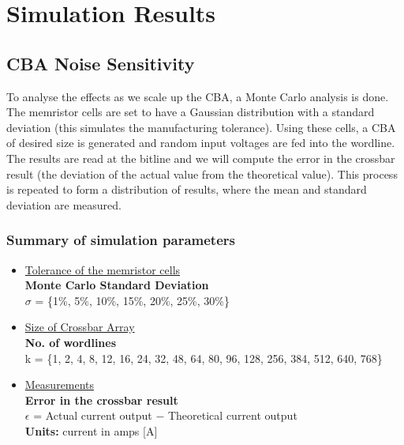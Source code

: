 
\chapter{Simulation Results}
\label{appendix:simulation_results}

\vspace{2em}

\section{\ac{CBA} Noise Sensitivity}
\label{appendix:simulation_results:cba_ns}

\noindent
To analyse the effects as we scale up the \ac{CBA}, a Monte Carlo analysis is done.
The memristor cells are set to have a Gaussian distribution with a standard deviation (this simulates the manufacturing tolerance).
Using these cells, a \ac{CBA} of desired size is generated and random input voltages are fed into the wordline.
The results are read at the bitline and we will compute the error in the crossbar result (the deviation of the actual value from the theoretical value). This process is repeated to form a distribution of results, where the mean and standard deviation are measured.

\subsection{Summary of simulation parameters}

\begin{itemize}
    \item \underline{Tolerance of the memristor cells}\\
        \textbf{Monte Carlo Standard Deviation} \\
            $\sigma$ = \{1\%,  5\%, 10\%, 15\%, 20\%, 25\%, 30\%\}
    \item \underline{Size of Crossbar Array} \\
        \textbf{No. of wordlines} \\
        k = \{1, 2, 4, 8, 12, 16, 24, 32, 48, 64, 80, 96, 128, 256, 384, 512, 640, 768\}
    \item \underline{Measurements} \\
        \textbf{Error in the crossbar result} \\
        $\epsilon$ = Actual current output $-$ Theoretical current output \\
        \textbf{Units:} {current in amps [A]}
\end{itemize}

